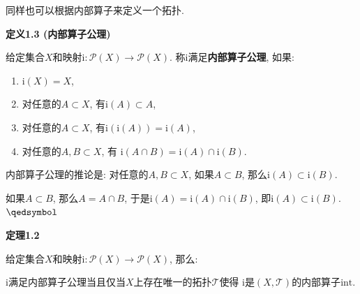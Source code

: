 同样也可以根据内部算子来定义一个拓扑.

\vspace{10pt}

\hypertarget{sec:定义1.3}{}
\noindent\textbf{定义1.3 (内部算子公理)}

给定集合$X$和映射$\mathrm{i}:\mathcal{P}(X)\to\mathcal{P}(X)$.
称$\mathrm{i}$满足\textbf{内部算子公理}, 如果:
\begin{enumerate}
    \item $\mathrm{i}(X)=X$,
    \item 对任意的$A\subset X$, 有$\mathrm{i}(A)\subset A$,
    \item 对任意的$A\subset X$, 有$\mathrm{i}(\mathrm{i}(A))=\mathrm{i}(A)$,
    \item 对任意的$A,B\subset X$, 有
    $\mathrm{i}(A\cap B)=\mathrm{i}(A)\cap\mathrm{i}(B)$.
\end{enumerate}

\vspace{10pt}

内部算子公理的推论是: 对任意的$A,B\subset X$,
如果$A\subset B$, 那么$\mathrm{i}(A)\subset\mathrm{i}(B)$.


如果$A\subset B$, 那么$A=A\cap B$,
于是$\mathrm{i}(A)=\mathrm{i}(A)\cap\mathrm{i}(B)$,
即$\mathrm{i}(A)\subset\mathrm{i}(B)$. \hfill $\qedsymbol$

\vspace{10pt}

\hypertarget{sec:定理1.2}{}
\noindent\textbf{定理1.2}

给定集合$X$和映射$\mathrm{i}:\mathcal{P}(X)\to\mathcal{P}(X)$, 那么:

$\mathrm{i}$满足内部算子公理当且仅当$X$上存在唯一的拓扑$\mathcal{T}$使得
$\mathrm{i}$是$(X,\mathcal{T})$的内部算子$\mathrm{int}$.




